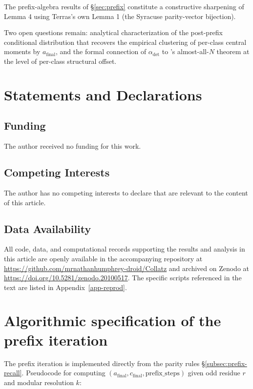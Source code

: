 \documentclass[pdflatex,sn-mathphys-num]{sn-jnl}
\theoremstyle{thmstyleone}%
\theoremstyle{definition}
\theoremstyle{plain}
\begin{document}
The prefix-algebra results of \S\ref{sec:prefix} constitute a constructive sharpening of \citet{terras1976} Lemma 4 using Terras's own Lemma 1 (the Syracuse parity-vector bijection).

Two open questions remain: analytical characterization of the post-prefix conditional distribution that recovers the empirical clustering of per-class central moments by $a_{\text{final}}$, and the formal connection of $\alpha_{\text{det}}$ to \citet{tao2022}'s almost-all-$N$ theorem at the level of per-class structural offset.

\section*{Statements and Declarations}

\subsection*{Funding}
The author received no funding for this work.

\subsection*{Competing Interests}
The author has no competing interests to declare that are relevant to the
content of this article.

\subsection*{Data Availability}
All code, data, and computational records supporting the results and analysis
in this article are openly available in the accompanying repository at
\url{https://github.com/mrnathanhumphrey-droid/Collatz} and archived on Zenodo
at \url{https://doi.org/10.5281/zenodo.20100517}. The specific scripts
referenced in the text are listed in Appendix~\ref{app-reprod}.

\appendix

\section{Algorithmic specification of the prefix iteration}
\label{app:prefix-algorithm}
The prefix iteration is implemented directly from the parity rules \S\ref{subsec:prefix-recall}. Pseudocode for computing $(a_{\text{final}}, c_{\text{final}}, \text{prefix\_steps})$ given odd residue $r$ and modular resolution $k$:
\end{document}
